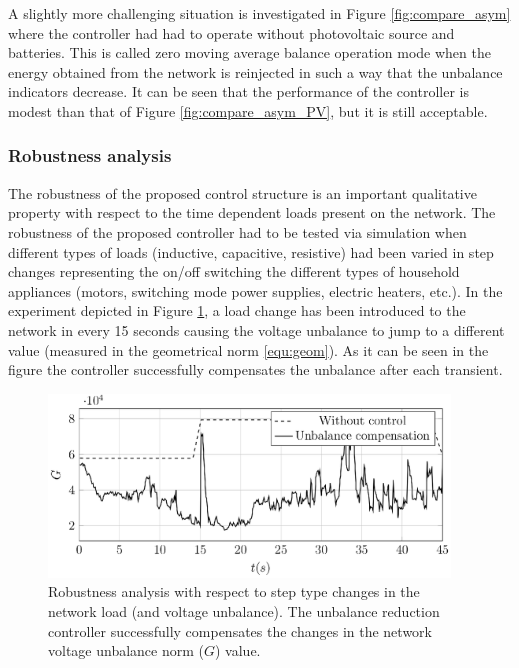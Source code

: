             A slightly more challenging situation is investigated in Figure \ref{fig:compare_asym} where the controller had had to operate without photovoltaic source and batteries. This is called zero moving average balance operation mode when the energy obtained from the network is reinjected in such a way that the unbalance indicators decrease. It can be seen that the performance of the controller is modest than that of Figure \ref{fig:compare_asym_PV}, but it is still acceptable.

      \subsubsection{Robustness analysis}\label{VUB:sec:Robustness}

            The robustness of the proposed control structure is an important qualitative property with respect to the time dependent loads present on the network. The robustness of the proposed controller had to be tested via simulation when different types of loads (inductive, capacitive, resistive) had been varied in step changes representing the on/off switching the different types of household appliances (motors, switching mode power supplies, electric heaters, etc.). In the experiment depicted in Figure \ref{fig:robustness}, a load change has been introduced to the network in every 15 seconds causing the voltage unbalance to jump to a different value (measured in the geometrical norm \ref{equ:geom}). As it can be seen in the figure the controller successfully compensates the unbalance after each transient.

              \begin{figure}[ht]
            \centering
            \includegraphics[width=0.95\textwidth]{Unblance_EPS_Pics/UnbalRedComp_JCP-figure5.eps}
            \caption{Robustness analysis with respect to step type changes in the network load (and voltage unbalance). The unbalance reduction controller successfully compensates the changes in the network voltage unbalance norm ($G$) value.}
            \label{fig:robustness}
            \end{figure}

